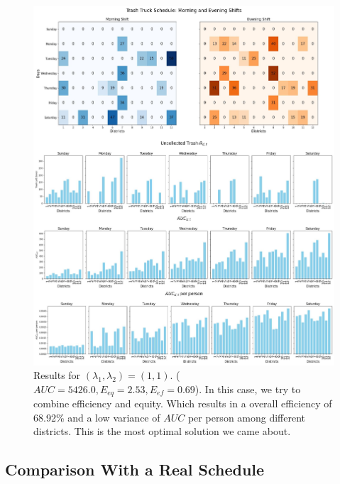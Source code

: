 \documentclass{article}
\begin{document}
\begin{figure}[H]
	\centering
	\includegraphics[width=1\textwidth]{figures/(1,1).jpg}
	\caption{Results for $(\lambda_1, \lambda_2) = (1,1)$. ($AUC = 5426.0, E_{eq} = 2.53, E_{ef} = 0.69$). In this case, we try to combine efficiency and equity. Which results in a overall efficiency of 68.92\% and a low variance of $AUC$ per person among different districts. This is the most optimal solution we came about. }
	\label{fig:5all}
\end{figure}
\newpage





\subsection{Comparison With a Real Schedule}
\end{document}
